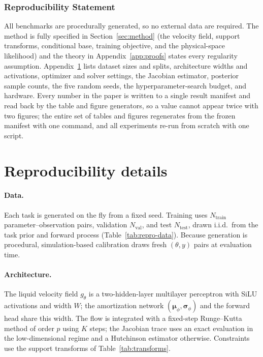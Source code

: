 
\subsubsection*{Reproducibility Statement}
All benchmarks are procedurally generated, so no external data are required. The
method is fully specified in Section~\ref{sec:method} (the velocity field,
support transforms, conditional base, training objective, and the physical-space
likelihood) and the theory in Appendix~\ref{app:proofs} states every regularity
assumption. Appendix~\ref{app:repro} lists dataset sizes and splits, architecture
widths and activations, optimizer and solver settings, the Jacobian estimator,
posterior sample counts, the five random seeds, the hyperparameter-search budget,
and hardware. Every number in the paper is written to a single result manifest
and read back by the table and figure generators, so a value cannot appear twice
with two figures; the entire set of tables and figures regenerates from the
frozen manifest with one command, and all experiments re-run from scratch with
one script.

\section{Reproducibility details}
\label{app:repro}

\paragraph{Data.} Each task is generated on the fly from a fixed seed. Training
uses $N_{\text{train}}$ parameter--observation pairs, validation $N_{\text{val}}$,
and test $N_{\text{test}}$, drawn i.i.d.\ from the task prior and forward process
(Table~\ref{tab:repro-data}). Because generation is procedural, simulation-based
calibration draws fresh $(\theta, y)$ pairs at evaluation time.

\paragraph{Architecture.} The liquid velocity field $g_\theta$ is a two-hidden-layer
multilayer perceptron with SiLU activations and width $W$; the amortization
network $(\boldsymbol{\mu}_\phi, \boldsymbol{\sigma}_\phi)$ and the forward head
share this width. The flow is integrated with a fixed-step Runge--Kutta method of
order $p$ using $K$ steps; the Jacobian trace uses an exact evaluation in the
low-dimensional regime and a Hutchinson estimator otherwise. Constraints use the
support transforms of Table~\ref{tab:transforms}.

